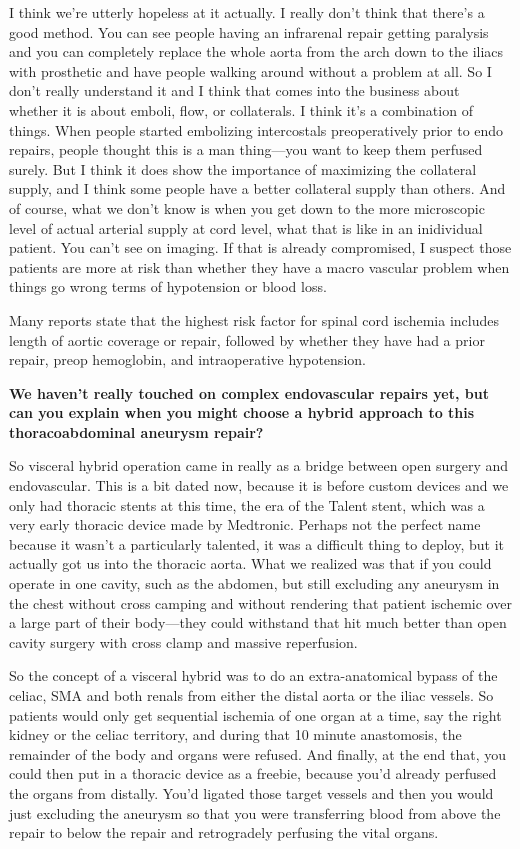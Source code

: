 \documentclass[
]{book}
\begin{document}
I think we're utterly hopeless at it actually. I really don't think that
there's a good method. You can see people having an infrarenal repair
getting paralysis and you can completely replace the whole aorta from
the arch down to the iliacs with prosthetic and have people walking
around without a problem at all. So I don't really understand it and I
think that comes into the business about whether it is about emboli,
flow, or collaterals. I think it's a combination of things. When people
started embolizing intercostals preoperatively prior to endo repairs,
people thought this is a man thing---you want to keep them perfused
surely. But I think it does show the importance of maximizing the
collateral supply, and I think some people have a better collateral
supply than others. And of course, what we don't know is when you get
down to the more microscopic level of actual arterial supply at cord
level, what that is like in an inidividual patient. You can't see on
imaging. If that is already compromised, I suspect those patients are
more at risk than whether they have a macro vascular problem when things
go wrong terms of hypotension or blood loss.

Many reports state that the highest risk factor for spinal cord ischemia
includes length of aortic coverage or repair, followed by whether they
have had a prior repair, preop hemoglobin, and intraoperative
hypotension.\citep{bisdas2015}

\textbf{We haven't really touched on complex endovascular repairs yet, but can
you explain when you might choose a hybrid approach to this
thoracoabdominal aneurysm repair?}

So visceral hybrid operation came in really as a bridge between open
surgery and endovascular. This is a bit dated now, because it is before
custom devices and we only had thoracic stents at this time, the era of
the Talent stent, which was a very early thoracic device made by
Medtronic. Perhaps not the perfect name because it wasn't a particularly
talented, it was a difficult thing to deploy, but it actually got us
into the thoracic aorta. What we realized was that if you could operate
in one cavity, such as the abdomen, but still excluding any aneurysm in
the chest without cross camping and without rendering that patient
ischemic over a large part of their body---they could withstand that hit
much better than open cavity surgery with cross clamp and massive
reperfusion.

So the concept of a visceral hybrid was to do an extra-anatomical bypass
of the celiac, SMA and both renals from either the distal aorta or the
iliac vessels. So patients would only get sequential ischemia of one
organ at a time, say the right kidney or the celiac territory, and
during that 10 minute anastomosis, the remainder of the body and organs
were refused. And finally, at the end that, you could then put in a
thoracic device as a freebie, because you'd already perfused the organs
from distally. You'd ligated those target vessels and then you would
just excluding the aneurysm so that you were transferring blood from
above the repair to below the repair and retrogradely perfusing the
vital organs.
\end{document}
